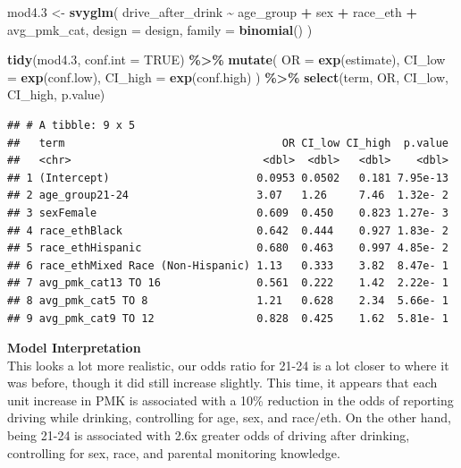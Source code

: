 \documentclass[
]{article}
\newenvironment{Shaded}{\begin{snugshade}}{\end{snugshade}}
\newcommand{\AttributeTok}[1]{\textcolor[rgb]{0.13,0.29,0.53}{#1}}
\newcommand{\ConstantTok}[1]{\textcolor[rgb]{0.56,0.35,0.01}{#1}}
\newcommand{\FloatTok}[1]{\textcolor[rgb]{0.00,0.00,0.81}{#1}}
\newcommand{\FunctionTok}[1]{\textcolor[rgb]{0.13,0.29,0.53}{\textbf{#1}}}
\newcommand{\NormalTok}[1]{#1}
\newcommand{\OtherTok}[1]{\textcolor[rgb]{0.56,0.35,0.01}{#1}}
\newcommand{\SpecialCharTok}[1]{\textcolor[rgb]{0.81,0.36,0.00}{\textbf{#1}}}
\begin{document}
\begin{Shaded}
\begin{Highlighting}[]
\NormalTok{mod4}\FloatTok{.3} \OtherTok{\textless{}{-}} \FunctionTok{svyglm}\NormalTok{(}
\NormalTok{  drive\_after\_drink }\SpecialCharTok{\textasciitilde{}}\NormalTok{ age\_group }\SpecialCharTok{+}\NormalTok{ sex }\SpecialCharTok{+}\NormalTok{ race\_eth }\SpecialCharTok{+}\NormalTok{ avg\_pmk\_cat,}
  \AttributeTok{design =}\NormalTok{ design,}
  \AttributeTok{family =} \FunctionTok{binomial}\NormalTok{()}
\NormalTok{) }

\FunctionTok{tidy}\NormalTok{(mod4}\FloatTok{.3}\NormalTok{, }\AttributeTok{conf.int =} \ConstantTok{TRUE}\NormalTok{) }\SpecialCharTok{\%\textgreater{}\%}
  \FunctionTok{mutate}\NormalTok{(}
    \AttributeTok{OR =} \FunctionTok{exp}\NormalTok{(estimate),}
    \AttributeTok{CI\_low =} \FunctionTok{exp}\NormalTok{(conf.low),}
    \AttributeTok{CI\_high =} \FunctionTok{exp}\NormalTok{(conf.high)}
\NormalTok{  ) }\SpecialCharTok{\%\textgreater{}\%}
  \FunctionTok{select}\NormalTok{(term, OR, CI\_low, CI\_high, p.value) }
\end{Highlighting}
\end{Shaded}

\begin{verbatim}
## # A tibble: 9 x 5
##   term                                  OR CI_low CI_high  p.value
##   <chr>                              <dbl>  <dbl>   <dbl>    <dbl>
## 1 (Intercept)                       0.0953 0.0502   0.181 7.95e-13
## 2 age_group21-24                    3.07   1.26     7.46  1.32e- 2
## 3 sexFemale                         0.609  0.450    0.823 1.27e- 3
## 4 race_ethBlack                     0.642  0.444    0.927 1.83e- 2
## 5 race_ethHispanic                  0.680  0.463    0.997 4.85e- 2
## 6 race_ethMixed Race (Non-Hispanic) 1.13   0.333    3.82  8.47e- 1
## 7 avg_pmk_cat13 TO 16               0.561  0.222    1.42  2.22e- 1
## 8 avg_pmk_cat5 TO 8                 1.21   0.628    2.34  5.66e- 1
## 9 avg_pmk_cat9 TO 12                0.828  0.425    1.62  5.81e- 1
\end{verbatim}

\textbf{Model Interpretation}\\
This looks a lot more realistic, our odds ratio for 21-24 is a lot
closer to where it was before, though it did still increase slightly.
This time, it appears that each unit increase in PMK is associated with
a 10\% reduction in the odds of reporting driving while drinking,
controlling for age, sex, and race/eth. On the other hand, being 21-24
is associated with 2.6x greater odds of driving after drinking,
controlling for sex, race, and parental monitoring knowledge.
\end{document}
